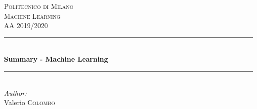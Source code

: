 \documentclass[12pt]{article}
\begin{document}
\begin{titlepage}

\newcommand{\HRule}{\rule{\linewidth}{0.5mm}} %

\center %
 

\textsc{\LARGE Politecnico di Milano}\\[1.5cm] %
\textsc{\Large Machine Learning}\\[0.5cm] %
\textsc{\large AA 2019/2020}\\[0.5cm] %


\HRule \\[0.4cm]
{ \huge \bfseries Summary - Machine Learning}\\[0.4cm] %
\HRule \\[1.5cm]
 



\Large \emph{Author:}\\
Valerio \textsc{Colombo}\\[3cm] %


\end{titlepage}
\end{document}
